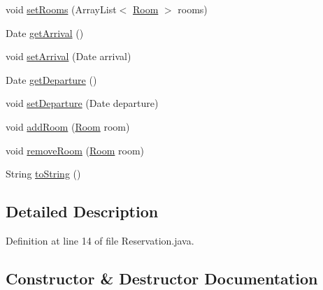 \begin{DoxyCompactItemize}
\item 
void \mbox{\hyperlink{classbspq18__e4_1_1_gestion_hotelera_1_1server_1_1data_1_1_reservation_a78f50ca99372197775d10794b46e117c}{set\+Rooms}} (Array\+List$<$ \mbox{\hyperlink{classbspq18__e4_1_1_gestion_hotelera_1_1server_1_1data_1_1_room}{Room}} $>$ rooms)
\item 
Date \mbox{\hyperlink{classbspq18__e4_1_1_gestion_hotelera_1_1server_1_1data_1_1_reservation_acbd1585b38746d7db6e37c33f7f63de4}{get\+Arrival}} ()
\item 
void \mbox{\hyperlink{classbspq18__e4_1_1_gestion_hotelera_1_1server_1_1data_1_1_reservation_ae729c17680ca02e6237fb2fc8a818b73}{set\+Arrival}} (Date arrival)
\item 
Date \mbox{\hyperlink{classbspq18__e4_1_1_gestion_hotelera_1_1server_1_1data_1_1_reservation_a6b62ed923c01428ff18ee6c1e02c6757}{get\+Departure}} ()
\item 
void \mbox{\hyperlink{classbspq18__e4_1_1_gestion_hotelera_1_1server_1_1data_1_1_reservation_a37004aad7995905e80734dd0da5173a9}{set\+Departure}} (Date departure)
\item 
void \mbox{\hyperlink{classbspq18__e4_1_1_gestion_hotelera_1_1server_1_1data_1_1_reservation_aec471d1fd1f9a312a7b532ddc18fc68b}{add\+Room}} (\mbox{\hyperlink{classbspq18__e4_1_1_gestion_hotelera_1_1server_1_1data_1_1_room}{Room}} room)
\item 
void \mbox{\hyperlink{classbspq18__e4_1_1_gestion_hotelera_1_1server_1_1data_1_1_reservation_aa24c2b395be44d1a25644dfe6a21c063}{remove\+Room}} (\mbox{\hyperlink{classbspq18__e4_1_1_gestion_hotelera_1_1server_1_1data_1_1_room}{Room}} room)
\item 
String \mbox{\hyperlink{classbspq18__e4_1_1_gestion_hotelera_1_1server_1_1data_1_1_reservation_a0861b284470c3b9ada014ddceb4edfca}{to\+String}} ()
\end{DoxyCompactItemize}


\subsection{Detailed Description}


Definition at line 14 of file Reservation.\+java.



\subsection{Constructor \& Destructor Documentation}
\mbox{\label{classbspq18__e4_1_1_gestion_hotelera_1_1server_1_1data_1_1_reservation_a7f8b69576ffa54f72edef9a3d4fd9d00}} 
